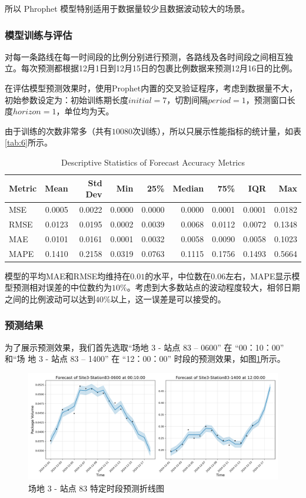 \documentclass{MMCStyle}
\begin{document}
所以 Phrophet 模型特别适用于数据量较少且数据波动较大的场景。

\subsubsection{模型训练与评估}

对每一条路线在每一时间段的比例分别进行预测，各路线及各时间段之间相互独立。每次预测都根据12月1日到12月15日的包裹比例数据来预测12月16日的比例。

在评估模型预测效果时，使用Prophet内置的交叉验证程序，考虑到数据量不大，初始参数设定为：初始训练期长度\(initial = 7\)，切割间隔\(period = 1\)，预测窗口长度\(horizon = 1\)，单位均为天。

由于训练的次数非常多（共有\(10080\)次训练），所以只展示性能指标的统计量，如表\ref{tab:6}所示。

\begin{table}[htbp]
\centering
\caption{Descriptive Statistics of Forecast Accuracy Metrics}
\label{tab:metrics}
\begin{tabular}{lrrrrrrrr}
\toprule
Metric & Mean & Std Dev & Min & 25\% & Median & 75\% & IQR & Max \\
\midrule
MSE    & 0.0005 & 0.0022 & 0.0000 & 0.0000 & 0.0000 & 0.0001 & 0.0001 & 0.0182 \\
RMSE   & 0.0123 & 0.0195 & 0.0002 & 0.0039 & 0.0068 & 0.0112 & 0.0072 & 0.1348 \\
MAE    & 0.0101 & 0.0161 & 0.0001 & 0.0032 & 0.0058 & 0.0090 & 0.0058 & 0.1023 \\
MAPE   & 0.1410 & 0.2158 & 0.0319 & 0.0763 & 0.1115 & 0.1756 & 0.1493 & 0.5664 \\
\bottomrule
\end{tabular}
\end{table}

模型的平均MAE和RMSE均维持在\(0.01\)的水平，中位数在\(0.06\)左右，MAPE显示模型预测相对误差的中位数约为\(10\%\)。考虑到大多数站点的波动程度较大，相邻日期之间的比例波动可以达到\(40\%\)以上，这一误差是可以接受的。

\subsubsection{预测结果}
为了展示预测效果，我们首先选取“场地 3 - 站点 83 – 0600” 在 “00：10：00” 和“场
地 3 - 站点 83 – 1400” 在 “12：00：00” 时段的预测效果，如图\ref{fig:9}所示。

\begin{figure}[htb]
	\centering
	\includegraphics[width=\linewidth]{forecast_comparison.png}
	\caption{场地 3 - 站点 83 特定时段预测折线图}
	\label{fig:9}
\end{figure}
\end{document}

